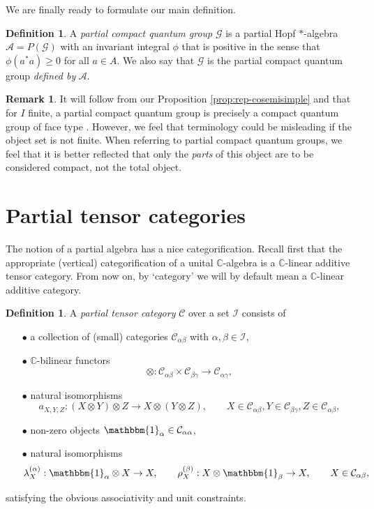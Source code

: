 \documentclass[10pt]{article}
\newcommand{\C}{\mathbb{C}}
\newcommand{\CatC}{\mathcal{C}}
\newcommand{\CatCC}{\mathscr{C}}
\newcommand{\Unitb}{\mathbbm{1}}
\theoremstyle{definition}
\newtheorem{Def}[Theorem]{Definition}
\newtheorem{Rem}[Theorem]{Remark}
\numberwithin{equation}{section}
\begin{document}
We are finally ready to formulate our main definition.
\begin{Def} A \emph{partial compact quantum group} $\mathscr{G}$ is a
  partial Hopf $*$-algebra $\mathscr{A} = P(\mathscr{G})$ with an invariant integral  $\phi$ that is positive in the sense  that $\phi(a^*a)\geq 0$ for all $a\in A$. We also say that $\mathscr{G}$ is the partial compact quantum group \emph{defined by} $\mathscr{A}$.
\end{Def} 

\begin{Rem} It will follow from our Proposition \ref{prop:rep-cosemisimple} and  \cite[Theorem 3.3 and Theorem 4.4]{Hay1} that for $I$ finite, a partial compact quantum group is precisely a compact quantum group of face type \cite[Definition 4.1]{Hay1}. However, we feel that terminology could be misleading if the object set is not finite. When referring to partial compact quantum groups, we feel that it is better reflected that only the \emph{parts} of this object are to be considered compact, not the total object. 
\end{Rem} 

\section{Partial tensor categories}


The notion of a partial algebra has a nice categorification. Recall first that the appropriate (vertical) categorification of a unital $\C$-algebra is a $\C$-linear additive tensor category. From now on, by `category' we will by default mean a $\C$-linear additive category. 

\begin{Def} A \emph{partial tensor category} $\CatCC$ over a set $\mathscr{I}$ consists of 
\begin{itemize}
\item[$\bullet$] a collection of (small) categories $\mathcal{C}_{\alpha\beta}$ with $\alpha,\beta\in \mathscr{I}$, 
\item[$\bullet$] $\C$-bilinear functors \[\otimes: \CatC_{\alpha\beta}\times \CatC_{\beta\gamma}\rightarrow \CatC_{\alpha\gamma},\] 
\item[$\bullet$] natural isomorphisms \[ a_{X,Y,Z}: (X\otimes Y)\otimes Z \rightarrow X\otimes (Y\otimes Z),\qquad X \in \CatC_{\alpha\beta},Y\in \CatC_{\beta\gamma},Z\in \CatC_{\alpha\beta},\] 
\item[$\bullet$] non-zero objects $\Unitb_{\alpha} \in \CatC_{\alpha\alpha}$,
\item[$\bullet$] natural isomorphisms \[\lambda_X^{(\alpha)}:\Unitb_\alpha\otimes X \rightarrow X,\qquad \rho_X^{(\beta)}:X\otimes \Unitb_\beta\rightarrow X, \qquad X\in \CatC_{\alpha\beta},\]
\end{itemize}
satisfying the obvious associativity and unit constraints. 
\end{Def}
\end{document}

